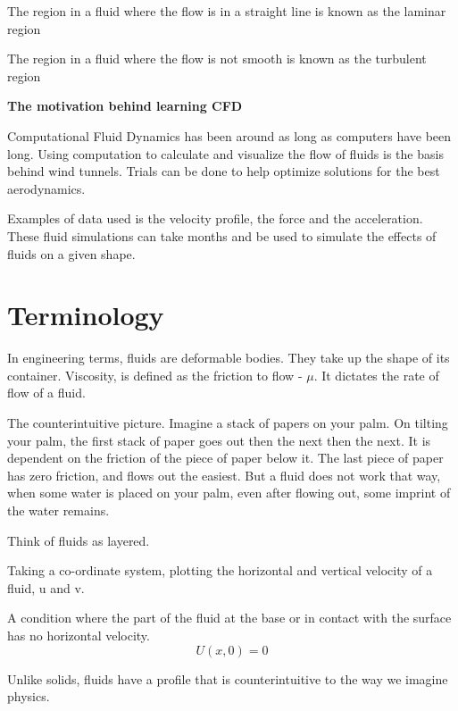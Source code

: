 \documentclass{report}
\begin{document}
\begin{definition}
The region in a fluid where the flow is in a straight line is known as the laminar region 
\end{definition}

\begin{definition}
The region in a fluid where the flow is not smooth is known as the turbulent region
\end{definition}

\textbf{The motivation behind learning CFD}

Computational Fluid Dynamics has been around as long as computers have been long. Using computation to calculate and visualize the flow of fluids is the basis behind wind tunnels. Trials can be done to help optimize solutions for the best aerodynamics.

Examples of data used is the velocity profile, the force and the acceleration. These fluid simulations can take months and be used to simulate the effects of fluids on a given shape.

\section{Terminology}
In engineering terms, fluids are deformable bodies. They take up the shape of its container. Viscosity, is defined as the friction to flow - $\mu$. It dictates the rate of flow of a fluid.

The counterintuitive picture. Imagine a stack of papers on your palm.  On tilting your palm, the first stack of paper goes out then the next then the next. It is dependent on the friction of the piece of paper below it. The last piece of paper has zero friction, and flows out the easiest. But a fluid does not work that way, when some water is placed on your palm, even after flowing out, some imprint of the water remains. 

Think of fluids as layered.

Taking a co-ordinate system, plotting the horizontal and vertical velocity of a fluid, u and v.

\begin{definition}
  A condition where the part of the fluid at the base or in contact with the surface has no horizontal velocity.
  \[
    U(x,0) = 0
  \]
\end{definition}

Unlike solids, fluids have a profile that is counterintuitive to the way we imagine physics.
\end{document}
